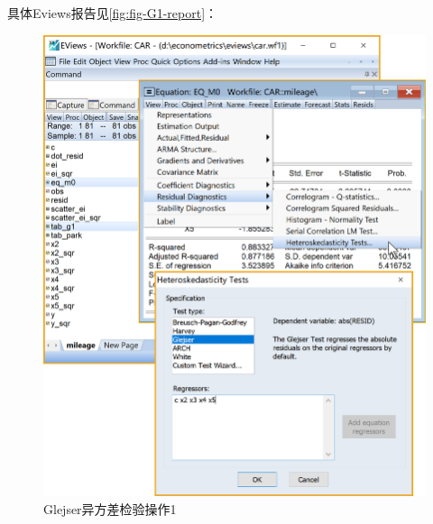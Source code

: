 \documentclass[12pt,(landscape,a4paper),(portrait,a4paper)]{article}
\begin{document}
具体Eviews报告见\ref{fig:fig-G1-report}：

\begin{figure}

{\centering \includegraphics[width=24.12in]{picture/lab6-heteroskedasticity/4-test-G1-1} 

}

\caption{Glejser异方差检验操作1}\label{fig:fig-G1-test}
\end{figure}
\end{document}
